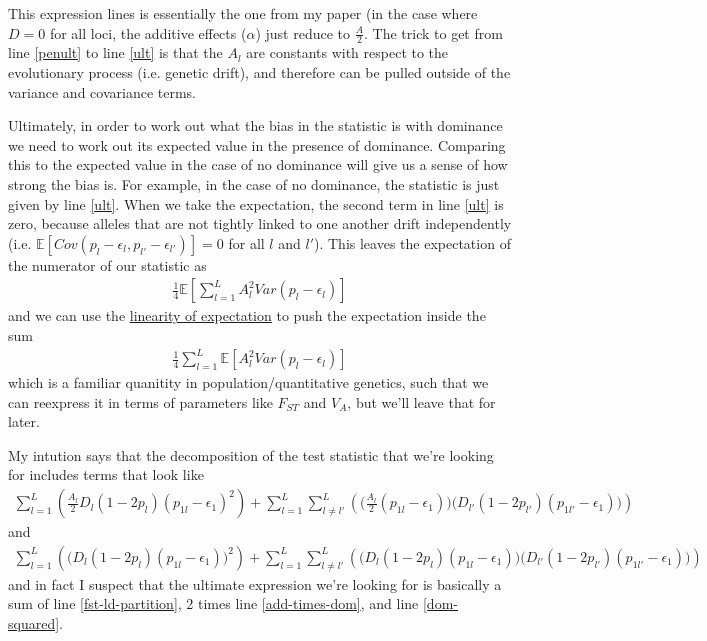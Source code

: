 \documentclass[a4paper,10pt]{article}
\begin{document}
  This expression lines is essentially the one from my paper (in the case where $D=0$ for all loci, the additive effects ($\alpha$) just reduce to $\frac{A}{2}$. The trick to get from line \eqref{penult} to line \eqref{ult} is that the $A_l$ are constants with respect to the evolutionary process (i.e. genetic drift), and therefore can be pulled outside of the variance and covariance terms.

  Ultimately, in order to work out what the bias in the statistic is with dominance we need to work out its expected value in the presence of dominance. Comparing this to the expected value in the case of no dominance will give us a sense of how strong the bias is. For example, in the case of no dominance, the statistic is just given by line \eqref{ult}. When we take the expectation, the second term in line \eqref{ult} is zero, because alleles that are not tightly linked to one another drift independently (i.e. $\mathbb{E}[Cov(p_l -\epsilon_l,p_{l'}-\epsilon_{l'})] = 0$ for all $l$ and $l'$). This leaves the expectation of the numerator of our statistic as
  \begin{align}
    \frac{1}{4}\mathbb{E}\left[\sum_{l=1}^L A_l^2 Var(p_l - \epsilon_l)\right]
    \end{align}
    and we can use the \href{https://en.wikipedia.org/wiki/Expected_value#Linearity}{linearity of expectation} to push the expectation inside the sum
    \begin{align}
      \frac{1}{4}\sum_{l=1}^L \mathbb{E}\left[A_l^2 Var(p_l - \epsilon_l)\right]
    \end{align}
    which is a familiar quanitity in population/quantitative genetics, such that we can reexpress it in terms of parameters like $F_{ST}$ and $V_A$, but we'll leave that for later.

    My intution says that the decomposition of the test statistic that we're looking for includes terms that look like 
    \begin{align}
      \sum^L_{l=1}\left(\frac{A_l}{2}D_l(1-2p_l)(p_{1l}-\epsilon_{1})^2\right) + \sum^L_{l=1}\sum^L_{l\neq l'}\left(\Bigg(\frac{A_l}{2}(p_{1l}-\epsilon_{1})\Bigg)\Bigg(D_{l'}\left(1-2p_{l'}\right)\left(p_{1l'}-\epsilon_{1}\right)\Bigg)\right) \label{add-times-dom}
    \end{align}
    and
    \begin{align}
      \sum^L_{l=1}\left(\Big(D_l(1-2p_l)(p_{1l}-\epsilon_{1})\Big)^2\right) + \sum^L_{l=1}\sum^L_{l\neq l'}\left(\Bigg(D_{l}\left(1-2p_{l}\right)\left(p_{1l}-\epsilon_{1}\right)\Bigg)\Bigg(D_{l'}\left(1-2p_{l'}\right)\left(p_{1l'}-\epsilon_{1}\right)\Bigg)\right) \label{dom-squared}
    \end{align}
    and in fact I suspect that the ultimate expression we're looking for is basically a sum of line \eqref{fst-ld-partition}, 2 times line \eqref{add-times-dom}, and line \eqref{dom-squared}.
\end{document}
